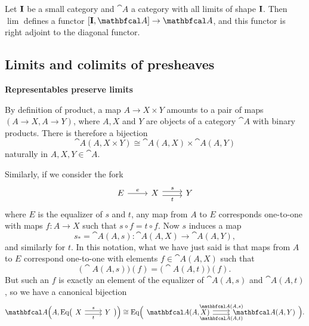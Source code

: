 \begin{proposition}
    Let $\mathbf{I}$ be a small category and $\cat{A}$ a category with all limits of shape $\mathbf{I}$. Then $\lim$ defines a functor $[\bcat{I},\cat{A}]\to\cat{A}$, and this functor is right adjoint to the diagonal functor.
\end{proposition}

\subsection{Limits and colimits of presheaves}
\begin{center}
    \textbf{Representables preserve limits}
\end{center}
By definition of product, a map $A\to X\times Y$ amounts to a pair of maps $(A\to X, A\to Y)$, where $A,X$ and $Y$ are objects of a category $\cat{A}$ with binary products. There is therefore a bijection
\begin{equation*}
    \cat{A}(A,X\times Y)\cong \cat{A}(A,X)\times\cat{A}(A,Y)
\end{equation*}
naturally in $A,X,Y\in\cat{A}$.\par

Similarly, if we consider the fork \begin{equation*}
\begin{tikzcd}
    E \arrow[r, "e"] & X \arrow[r, shift left, "s"] \arrow[r, shift right, "t"'] & Y
\end{tikzcd}
\end{equation*}
where $E$ is the equalizer of $s$ and $t$, any map from $A$ to $E$ corresponds one-to-one with maps $f:A\to X$ such that $s\circ f=t\circ f$. Now $s$ induces a map
\begin{equation*}
    s_*=\cat{A}(A,s): \cat{A}(A,X)\to\cat{A}(A,Y),
\end{equation*}
and similarly for $t$. In this notation, what we have just said is that maps from $A$ to $E$ correspond one-to-one with elements $f\in\cat{A}(A,X)$ such that
\begin{equation*}
    \big( \cat{A}(A,s) \big)(f)=\big( \cat{A}(A,t) \big)(f).
\end{equation*}
But such an $f$ is exactly an element of the equalizer of $\cat{A}(A,s)$ and $\cat{A}(A,t)$, so we have a canonical bijection
\begin{equation*}
    \cat{A}\Big( A, \text{Eq}\big( \begin{tikzcd}
        X \arrow[r, shift left, "s"] \arrow[r, shift right, "t"'] & Y
\end{tikzcd} \big) \Big) \cong \text{Eq}\Big( \begin{tikzcd}
        \cat{A}(A,X) \arrow[r, shift left, "\cat{A}(A{,}s)"] \arrow[r, shift right, "\cat{A}(A{,}t)"'] & \cat{A}(A,Y)
\end{tikzcd} \Big).
\end{equation*}

